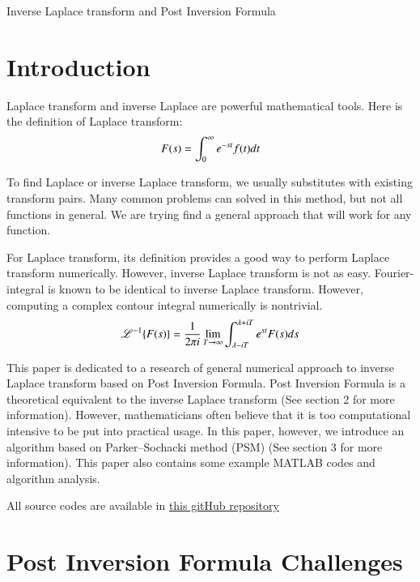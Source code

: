 \documentclass[12pt]{article}
\begin{document}
\centerline{\Large Inverse Laplace transform and Post Inversion Formula}
\vspace{1cm}

\newsavebox\foobox
\newlength{\foodim}
\newcommand{\slantbox}[2][0]{\mbox{%
        \sbox{\foobox}{#2}%
        \foodim=#1\wd\foobox
        \hskip \wd\foobox
        \hskip -0.5\foodim
        \pdfsave
        \pdfsetmatrix{1 0 #1 1}%
        \llap{\usebox{\foobox}}%
        \pdfrestore
        \hskip 0.5\foodim
}}
\def\Laplace{\ThisStyle{\slantbox[-.45]{$\SavedStyle\mathscr{L}$}}}


\section{Introduction}

Laplace transform and inverse Laplace are powerful mathematical tools. Here is the definition of Laplace transform:
$$F(s) = \int_{0}^{\infty} e^{-st} f(t) dt$$

To find Laplace or inverse Laplace transform, we usually substitutes with existing transform pairs. Many common problems can solved in this method, but not all functions in general. We are trying find a general approach that will work for any function.

For Laplace transform, its definition provides a good way to perform Laplace transform numerically. However, inverse Laplace transform is not as easy.
Fourier-integral is known to be identical to inverse Laplace transform. However, computing a complex contour integral numerically is nontrivial.
$$ \mathscr{L}^{-1}\{ F(s) \} = \frac{1}{2\pi i}\lim_{T \rightarrow \infty} \int_{\lambda - i T}^{\lambda + i T} e^{s t} F(s) ds $$

This paper is dedicated to a research of general numerical approach to inverse Laplace transform based on Post Inversion Formula.
Post Inversion Formula is a theoretical equivalent to the inverse Laplace transform (See section 2 for more information). \cite{PI} However, mathematicians often believe that it is too computational intensive to be put into practical usage. In this paper, however, we introduce an algorithm based on Parker–Sochacki method (PSM) (See section 3 for more information).
This paper also contains some example MATLAB codes and algorithm analysis.

All source codes are available in 
\href{https://github.com/fredzqm/laplace}{this gitHub repository}



\section{Post Inversion Formula Challenges}
\end{document}
